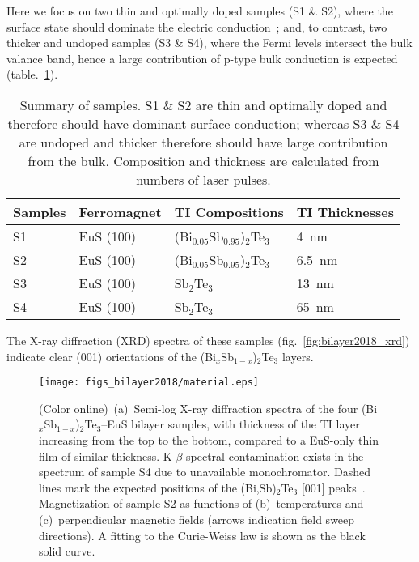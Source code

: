 Here we focus on two thin and optimally doped samples (S1 \& S2), where the surface state should dominate the electric conduction~\cite{ZhangJS2011}; and, to contrast, two thicker and undoped samples (S3 \& S4), where the Fermi levels intersect the bulk valance band, hence a large contribution of p-type bulk conduction is expected (table.~\ref{tab:bl2018_samples}). 
\begin{table}[ht]
    \centering
    \begin{tabularx}{0.7\columnwidth}[t]{l|l|l|X}
		\hline\hline
        Samples & Ferromagnet & TI Compositions & TI Thicknesses\\
        \hline%
        S1 & EuS (100) & (Bi$_{0.05}$Sb$_{0.95}$)$_2$Te$_3$ & 4~nm\\
        S2 & EuS (100) & (Bi$_{0.05}$Sb$_{0.95}$)$_2$Te$_3$ & 6.5~nm\\
        S3 & EuS (100) & Sb$_2$Te$_3$ & 13~nm\\
        S4 & EuS (100) & Sb$_2$Te$_3$ & 65~nm\\
		\hline\hline
    \end{tabularx}
    \caption[Summary of (Bi$_x$Sb$_{1-x}$)$_2$Te$_3$--EuS bilayer samples presented in Chap.~\ref{ch:bilayer2018}]{\label{tab:bl2018_samples}Summary of samples. S1 \& S2 are thin and optimally doped and therefore should have dominant surface conduction; whereas S3 \& S4 are undoped and thicker therefore should have large contribution from the bulk. Composition and thickness are calculated from numbers of laser pulses.}
\end{table}
The X-ray diffraction (XRD) spectra of these samples (fig.~\ref{fig:bilayer2018_xrd}) indicate clear (001) orientations of the (Bi$_{x}$Sb$_{1-x}$)$_2$Te$_3$ layers. %
%
%
\begin{figure}[ht]%
    \centering%
    \texttt{[image: figs\_bilayer2018/material.eps]}%
    \subfloat{\label{fig:bilayer2018_xrd}}%
    \subfloat{\label{fig:bilayer2018_mvt}}%
    \subfloat{\label{fig:bilayer2018_mvh}}%
    \caption[X-Ray diffraction spectra and SQUID magnetometry of (Bi$_{x}$Sb$_{1-x}$)$_2$Te$_3$--EuS bilayer samples.]{\label{fig:bilayer2018_material}(Color online)~(a)~Semi-log X-ray diffraction spectra of the four (Bi$_{x}$Sb$_{1-x}$)$_2$Te$_3$--EuS bilayer samples, with thickness of the TI layer increasing from the top to the bottom, compared to a EuS-only thin film of similar thickness. K-$\beta$ spectral contamination exists in the spectrum of sample S4 due to unavailable monochromator. Dashed lines mark the expected positions of the (Bi,Sb)$_2$Te$_3$ [001] peaks~\protect\cite{SbStructure}. Magnetization of sample S2 as functions of (b)~temperatures and (c)~perpendicular magnetic fields (arrows indication field sweep directions). A fitting to the Curie-Weiss law is shown as the black solid curve.}%
\end{figure}%
